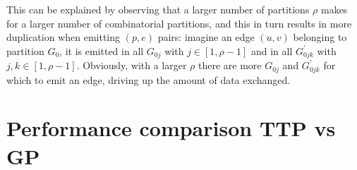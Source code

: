 \documentclass[paper=a4, fontsize=11pt]{scrartcl}
\begin{document}
This can be explained by observing that a larger number of partitions $\rho$
makes for a larger number of combinatorial partitions, and this in turn results
in more duplication when emitting $(p,e)$ pairs: imagine an edge $(u,v)$
belonging to partition $G_0$, it is emitted in all $G_{0j}$ with $j\in[1,
\rho-1]$ and in all $G^\prime_{0jk}$ with $j,k\in[1, \rho-1]$. Obviously, with a
larger $\rho$ there are more $G_{0j}$ and $G^\prime_{0jk}$ for which to emit an
edge, driving up the amount of data exchanged.

\section{Performance comparison TTP vs GP}



\end{document}
